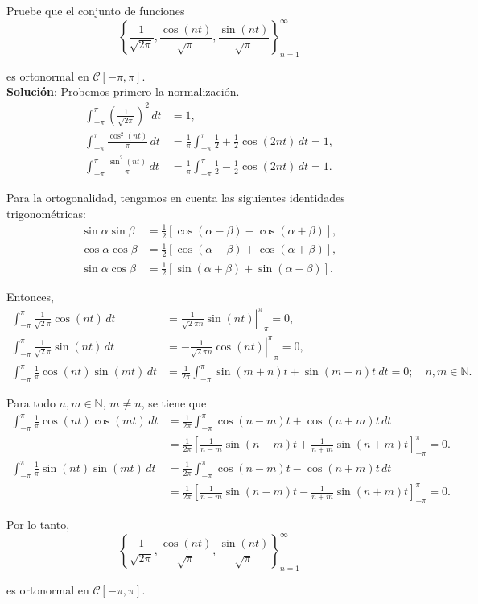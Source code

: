\begin{ejemplo}
Pruebe que el conjunto de funciones 
$$\left\{ \frac{1}{\sqrt{2 \pi}}, \frac{\cos(nt)}{\sqrt{\pi}} ,  \frac{\sin(nt)}{\sqrt{\pi}} \right\}_{n=1}^{\infty}$$

es ortonormal en $\mathscr{C}[-\pi,\pi]$.
\\

\textbf{Solución}: Probemos primero la normalización.
\begin{align*}
    \int_{-\pi}^{\pi} \left( \frac{1}{\sqrt{2\pi}} \right)^2 \,dt &= 1, \\
    \int_{-\pi}^{\pi} \frac{\cos^2(nt)}{\pi} \,dt &=  \frac{1}{\pi} \int_{-\pi}^{\pi} \frac{1}{2} + \frac{1}{2} \cos(2n t) \,dt = 1, \\
    \int_{-\pi}^{\pi} \frac{\sin^2(nt)}{\pi} \,dt &=  \frac{1}{\pi} \int_{-\pi}^{\pi} \frac{1}{2} - \frac{1}{2} \cos(2n t) \,dt = 1.
\end{align*}

Para la ortogonalidad, tengamos en cuenta las siguientes identidades trigonométricas:
\begin{align*}
    \sin \alpha \sin \beta &= \frac{1}{2} [\cos(\alpha - \beta) - \cos(\alpha + \beta)], \\
    \cos \alpha \cos \beta &= \frac{1}{2} [\cos(\alpha - \beta) + \cos(\alpha + \beta)], \\
    \sin \alpha \cos \beta &= \frac{1}{2} [\sin(\alpha + \beta) + \sin(\alpha - \beta)].
\end{align*}

Entonces, 
\begin{align*}
    \int_{-\pi}^{\pi} \frac{1}{\sqrt{2} \pi} \cos(nt) \,dt &=  \left. \frac{1}{\sqrt{2}\pi n} \sin(nt) \right|_{-\pi}^{\pi} = 0, \\
     \int_{-\pi}^{\pi} \frac{1}{\sqrt{2} \pi} \sin(nt) \,dt &=   \left. - \frac{1}{\sqrt{2}\pi n} \cos(nt) \right|_{-\pi}^{\pi} = 0,\\
      \int_{-\pi}^{\pi} \frac{1}{\pi} \cos(n t) \sin(m t)\,dt &=  \frac{1}{2 \pi} \int_{-\pi}^{\pi} \sin(m+n)t + \sin(m-n)t \ dt = 0; \quad n,m \in \mathbb{N}. 
\end{align*}

Para todo $n, m \in \mathbb{N}$, $m \neq n$, se tiene que 
\begin{align*}
    \int_{-\pi}^{\pi} \frac{1}{\pi} \cos(n t) \cos(mt) \,dt &= \frac{1}{2\pi} \int_{-\pi}^{\pi} \cos(n-m)t + \cos(n+m) t\,dt \\
    &= \frac{1}{2\pi} \left[ \frac{1}{n-m} \sin(n-m)t + \frac{1}{n+m} \sin(n+m)t \right]_{-\pi}^{\pi} = 0. \\
     \int_{-\pi}^{\pi} \frac{1}{\pi} \sin(n t) \sin(mt) \,dt &=\frac{1}{2\pi} \int_{-\pi}^{\pi} \cos(n-m)t - \cos(n+m) t\,dt  \\
    &= \frac{1}{2\pi} \left[ \frac{1}{n-m} \sin(n-m)t - \frac{1}{n+m} \sin(n+m)t \right]_{-\pi}^{\pi} = 0.
\end{align*}

Por lo tanto, 
$$\left\{ \frac{1}{\sqrt{2 \pi}}, \frac{\cos(nt)}{\sqrt{\pi}} ,  \frac{\sin(nt)}{\sqrt{\pi}} \right\}_{n=1}^{\infty}$$

es ortonormal en $\mathscr{C}[-\pi,\pi]$.
\end{ejemplo}

